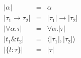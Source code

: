 
\[
\begin{array}{rcl}
  |\alpha|               & = & \alpha \\
  |\tau_1 \to \tau_2|    & = & |\tau_1| \to |\tau_2| \\
  |\forall \alpha. \tau| & = & \forall \alpha. |\tau| \\
  |t_1 \& t_2|           & = & \langle |\tau_1|, |\tau_2| \rangle \\
  |\{ l : \tau \}|       & = & |\tau|
\end{array}
\]